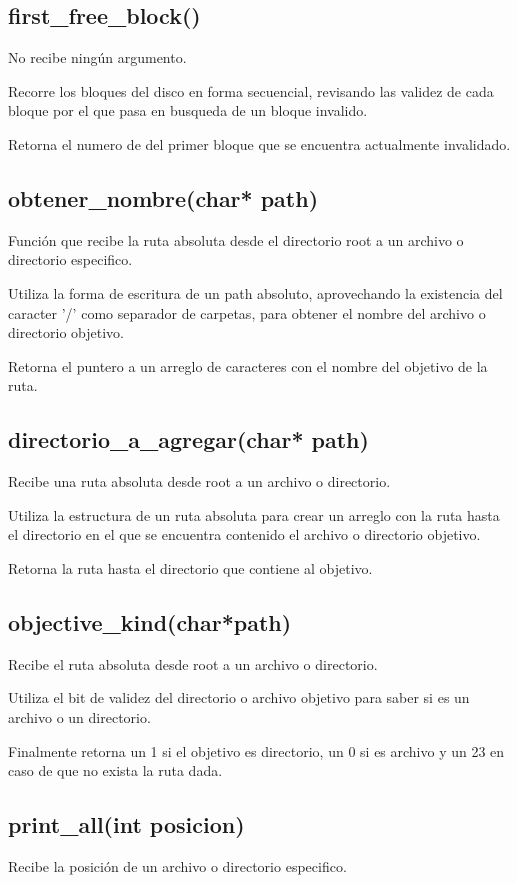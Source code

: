 \documentclass[12pt]{article}
\begin{document}
\subsection{first\_free\_block()}
No recibe ningún argumento.

Recorre los bloques del disco en forma secuencial, revisando las validez de cada bloque por el que pasa en busqueda de un bloque invalido.

Retorna el numero de del primer bloque que se encuentra actualmente invalidado.

\subsection{obtener\_nombre(char* path)}
Función que recibe la ruta absoluta desde el directorio root a un archivo o directorio especifico.

Utiliza la forma de escritura de un path absoluto, aprovechando la existencia del caracter '/' como separador de carpetas, para obtener el nombre del archivo o directorio objetivo.

Retorna el puntero a un arreglo de caracteres con el nombre del objetivo de la ruta.

\subsection{directorio\_a\_agregar(char* path)}
Recibe una ruta absoluta desde root a un archivo o directorio.

Utiliza la estructura de un ruta absoluta para crear un arreglo con la ruta hasta el directorio en el que se encuentra contenido el archivo o directorio objetivo.

Retorna la ruta hasta el directorio que contiene al objetivo.

\subsection{objective\_kind(char*path)}
Recibe el ruta absoluta desde root a un archivo o directorio.

Utiliza el bit de validez del directorio o archivo objetivo para saber si es un archivo o un directorio.

Finalmente retorna un 1 si el objetivo es directorio, un 0 si es archivo y un 23 en caso de que no exista la ruta dada.

\subsection{print\_all(int posicion)}
Recibe la posición de un archivo o directorio especifico.
\end{document}

